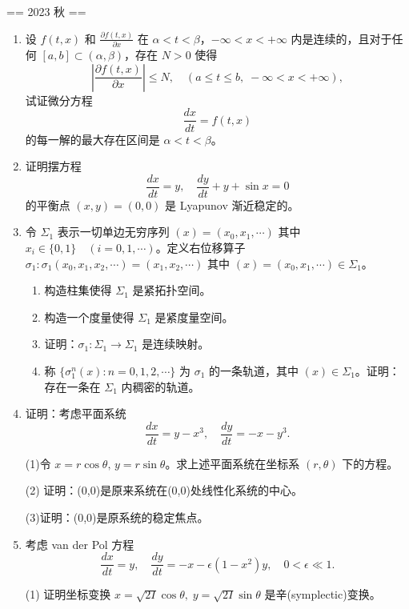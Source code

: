 == 2023 秋 ==
\begin{enumerate}
    \item[一、] 设 \( f(t, x) \) 和 \(\frac{\partial f(t, x)}{\partial x}\) 在 \(\alpha < t < \beta\)，\(-\infty < x < +\infty\) 内是连续的，且对于任何 \([a, b] \subset (\alpha, \beta)\)，存在 \(N > 0\) 使得
    \[
    \left| \frac{\partial f(t, x)}{\partial x} \right| \leq N, \quad (a \leq t \leq b, \; -\infty < x < +\infty),
    \]
    试证微分方程
    \[
    \frac{dx}{dt} = f(t, x)
    \]
    的每一解的最大存在区间是 \(\alpha < t < \beta\)。

    \item[二、] 证明摆方程
    \[
    \frac{dx}{dt} = y, \quad \frac{dy}{dt} + y + \sin x = 0
    \]
    的平衡点 \((x, y) = (0, 0)\) 是 Lyapunov 渐近稳定的。

    \item[三、] 令 \(\Sigma_1\) 表示一切单边无穷序列 \((x) = (x_0, x_1, \cdots)\) 其中 \(x_i \in \{0, 1\} \quad (i = 0, 1, \cdots)\)。定义右位移算子 \(\sigma_1: \sigma_1(x_0, x_1, x_2, \cdots) = (x_1, x_2, \cdots)\) 其中 \((x) = (x_0, x_1, \cdots) \in \Sigma_1\)。
    \begin{enumerate}
        \item 构造柱集使得 \(\Sigma_1\) 是紧拓扑空间。
        \item 构造一个度量使得 \(\Sigma_1\) 是紧度量空间。
        \item 证明：\(\sigma_1: \Sigma_1 \to \Sigma_1\) 是连续映射。
        \item 称 \(\{\sigma_1^n(x): n = 0, 1, 2, \cdots\}\) 为 \(\sigma_1\) 的一条轨道，其中 \((x) \in \Sigma_1\)。证明：存在一条在 \(\Sigma_1\) 内稠密的轨道。
    \end{enumerate}

    \item[四、] 证明：考虑平面系统
    \[
    \frac{dx}{dt} = y - x^3, \quad \frac{dy}{dt} = -x - y^3.
    \]

      (1)令 \( x = r \cos \theta, \, y = r \sin \theta \)。求上述平面系统在坐标系 \((r, \theta)\) 下的方程。

       (2) 证明：(0,0)是原来系统在(0,0)处线性化系统的中心。

      (3)证明：(0,0)是原系统的稳定焦点。


    \item[五、] 考虑 van der Pol 方程
    \[
    \frac{dx}{dt} = y, \quad \frac{dy}{dt} = -x - \epsilon (1 - x^2)y, \quad 0 < \epsilon \ll 1.
    \]
    
       (1) 证明坐标变换 \( x = \sqrt{2I} \cos \theta, \; y = \sqrt{2I} \sin \theta \) 是辛(symplectic)变换。
        

\end{enumerate}
